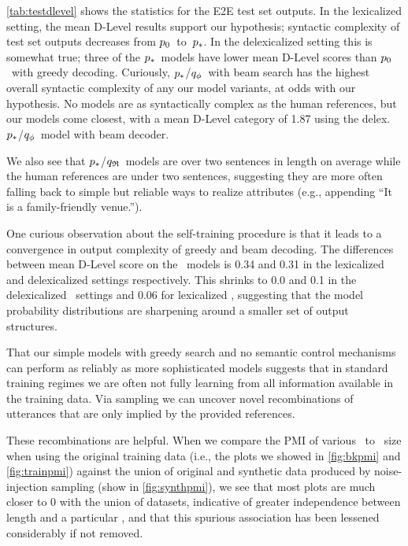 \autoref{tab:testdlevel} shows the statistics for the E2E test set outputs.  In
the lexicalized setting, the mean D-Level results support our hypothesis;
syntactic complexity of test set outputs decreases from
$p_0$~to~$p_*$.  In the delexicalized setting this is somewhat true;
three of the $p_*$~models have lower mean D-Level scores than
$p_0$~with greedy decoding. Curiously, $p_*$/${q_{\phi} }$~with beam
search has the highest overall syntactic complexity of any our model variants,
at odds with our hypothesis.  No models are as syntactically complex as the
human references, but our models come closest, with a mean D-Level category of
1.87 using the delex. $p_*$/${q_{\phi} }$~model with beam decoder.

We  also see that $p_*$/${q_{\mathfrak{R}} }$~models are over two sentences in
length on average while the human references are under two sentences,
suggesting they are more often falling back to simple but reliable ways to
realize attributes (e.g., appending ``It is a family-friendly venue.'').



One curious observation about the self-training procedure is that it leads to a
convergence in output complexity of greedy and beam decoding.  The differences
between mean D-Level score on the \basegen~models is 0.34 and 0.31 in the
lexicalized and delexicalized settings respectively.  This shrinks to 0.0 and
0.1 in the delexicalized \auggen~settings and 0.06 for lexicalized \auggen,
suggesting that the model probability distributions are sharpening around a
smaller set of output structures.

That our simple models with greedy search and no semantic control mechanisms
can perform as reliably as more sophisticated models suggests that in standard
training regimes we are often not fully learning from all information available
in the training data. Via sampling we can uncover novel recombinations of
utterances that are only implied by the provided references. 



These recombinations are helpful. When we compare the PMI of various
\attributevalues~to \meaningrepresentation~size when using the original
training data (i.e., the plots we showed in \autoref{fig:bkpmi} and
\autoref{fig:trainpmi}) against the union of original and synthetic data
produced by noise-injection sampling (show in \autoref{fig:synthpmi}), we see
that most plots are much closer to 0 with the union of datasets, indicative of
greater independence between length and a particular \attributevalue, and that
this spurious association has been lessened considerably if not removed.

